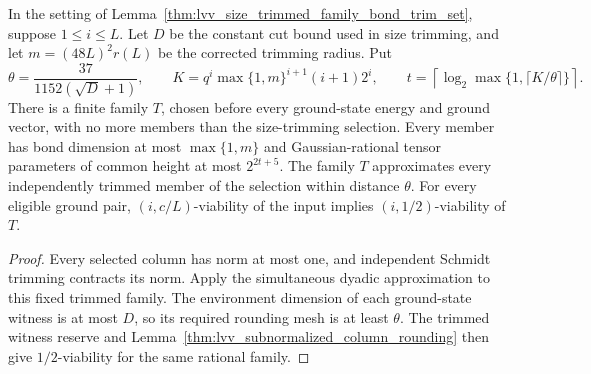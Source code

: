 \begin{lemma}
    \label{thm:lvv_rational_size_bond_trimming}
    \leanok
    In the setting of Lemma~\ref{thm:lvv_size_trimmed_family_bond_trim_set},
    suppose $1\le i\le L$. Let $D$ be the constant cut bound used in size
    trimming, and let $m=(48L)^2r(L)$ be the corrected trimming radius.
    Put
    \[
        \theta=\frac{37}{1152(\sqrt D+1)},\qquad
        K=q^i\max\{1,m\}^{i+1}(i+1)2^i,\qquad
        t=\left\lceil\log_2\max\{1,\lceil K/\theta\rceil\}\right\rceil.
    \]
    There is a finite family $T$, chosen before every ground-state energy
    and ground vector, with no more members than the size-trimming
    selection. Every member has bond dimension at most $\max\{1,m\}$ and Gaussian-rational
    tensor parameters of common height at most $2^{2t+5}$.
    The family $T$ approximates every independently trimmed member of the
    selection within distance $\theta$.
    For every eligible ground pair, $(i,c/L)$-viability of the input
    implies $(i,1/2)$-viability of $T$.
\end{lemma}
\begin{proof}\leanok
    Every selected column has norm at most one, and independent Schmidt
    trimming contracts its norm. Apply the simultaneous dyadic
    approximation to this fixed trimmed family. The environment dimension
    of each ground-state witness is at most $D$, so its required rounding
    mesh is at least $\theta$. The trimmed witness reserve and
    Lemma~\ref{thm:lvv_subnormalized_column_rounding} then give
    $1/2$-viability for the same rational family.
\end{proof}

